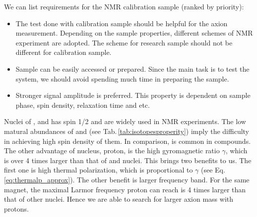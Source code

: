 We can list requirements for the NMR calibration sample (ranked by priority):
\begin{itemize}
    \item The test done with calibration sample should be helpful for the axion measurement. Depending on the sample properties, different schemes of NMR experiment are adopted. The scheme for research sample should not be different for calibration sample. 
    \item Sample can be easily accessed or prepared. Since the main task is to test the system, we should avoid spending much time in preparing the sample. 
    \item Stronger signal amplitude is preferred. This property is dependent on sample phase, spin density, relaxation time and etc. 
\end{itemize}

Nuclei of ,  and  has spin 1/2 and are widely used in NMR experiments. The low matural abundances of  and  (see Tab.\,\ref{tab:isotopesproperity}) imply the difficulty in achieving high spin density of them. In comparison,  is common in compounds. The other advantage of  nucleus, proton, is the high gyromagnetic ratio $\gamma$, which is over 4 times larger than that of  and  nuclei. This brings two benefits to us. The first one is high thermal polarization, which is proportional to $\gamma$ (see Eq.\,\ref{eq:thermalp_approx}). The other benefit is larger frequency band. For the same magnet, the maximal Larmor frequency proton can reach is 4 times larger than that of other nuclei. Hence we are able to search for larger axion mass with protons. 


